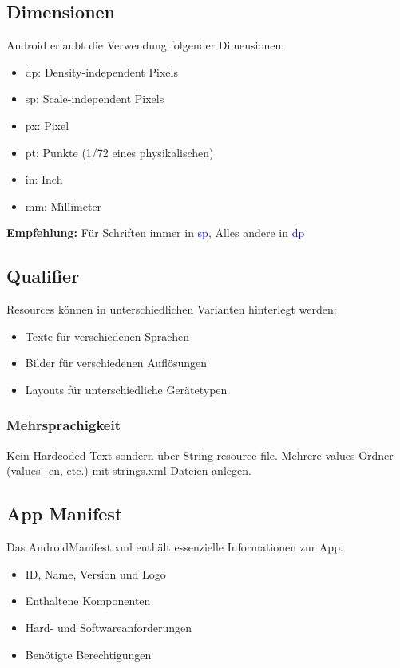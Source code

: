 \subsection{Dimensionen}
Android erlaubt die Verwendung folgender Dimensionen:
\begin{itemize}[topsep=0pt, leftmargin=4mm]
    \setlength\itemsep{-0.3em}
    \item dp: Density-independent Pixels
    \item sp: Scale-independent Pixels
    \item px: Pixel
    \item pt: Punkte (1/72 eines physikalischen)
    \item in: Inch
    \item mm: Millimeter
\end{itemize}
\textbf{Empfehlung:} Für Schriften immer in \textcolor{blue}{sp}, Alles andere in \textcolor{blue}{dp}
\subsection{Qualifier}
Resources können in unterschiedlichen Varianten hinterlegt werden:
\begin{itemize}[topsep=0pt, leftmargin=4mm]
    \setlength\itemsep{-0.3em}
    \item Texte für verschiedenen Sprachen
    \item Bilder für verschiedenen Auflösungen
    \item Layouts für unterschiedliche Gerätetypen
\end{itemize}
\subsubsection{Mehrsprachigkeit}
Kein Hardcoded Text sondern über String resource file. Mehrere values Ordner (values\_en, etc.) mit strings.xml Dateien anlegen.
\subsection{App Manifest}
Das AndroidManifest.xml enthält essenzielle Informationen zur App.
\begin{itemize}[topsep=0pt, leftmargin=4mm]
    \setlength\itemsep{-0.3em}
    \item ID, Name, Version und Logo
    \item Enthaltene Komponenten
    \item Hard- und Softwareanforderungen
    \item Benötigte Berechtigungen
\end{itemize}
